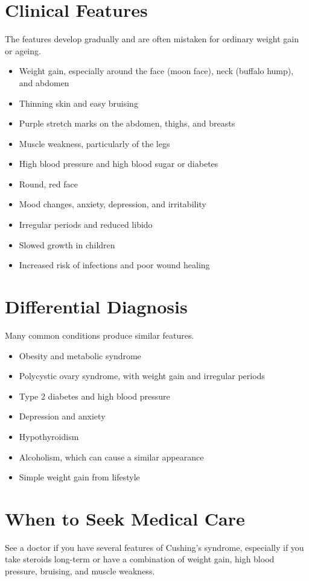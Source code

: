 \section*{Clinical Features}
The features develop gradually and are often mistaken for ordinary weight gain or ageing.

\begin{itemize}
    \item Weight gain, especially around the face (moon face), neck (buffalo hump), and abdomen
    \item Thinning skin and easy bruising
    \item Purple stretch marks on the abdomen, thighs, and breasts
    \item Muscle weakness, particularly of the legs
    \item High blood pressure and high blood sugar or diabetes
    \item Round, red face
    \item Mood changes, anxiety, depression, and irritability
    \item Irregular periods and reduced libido
    \item Slowed growth in children
    \item Increased risk of infections and poor wound healing
\end{itemize}

\section*{Differential Diagnosis}
Many common conditions produce similar features.

\begin{itemize}
    \item Obesity and metabolic syndrome
    \item Polycystic ovary syndrome, with weight gain and irregular periods
    \item Type 2 diabetes and high blood pressure
    \item Depression and anxiety
    \item Hypothyroidism
    \item Alcoholism, which can cause a similar appearance
    \item Simple weight gain from lifestyle
\end{itemize}

\section*{When to Seek Medical Care}
See a doctor if you have several features of Cushing's syndrome, especially if you take steroids long-term or have a combination of weight gain, high blood pressure, bruising, and muscle weakness.

